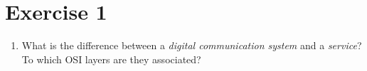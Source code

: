 {}
\section*{Exercise 1}

\begin{enumerate}
	\item What is the difference between a \emph{digital communication system} and a \emph{service}? To which OSI layers are they associated?
\end{enumerate}
